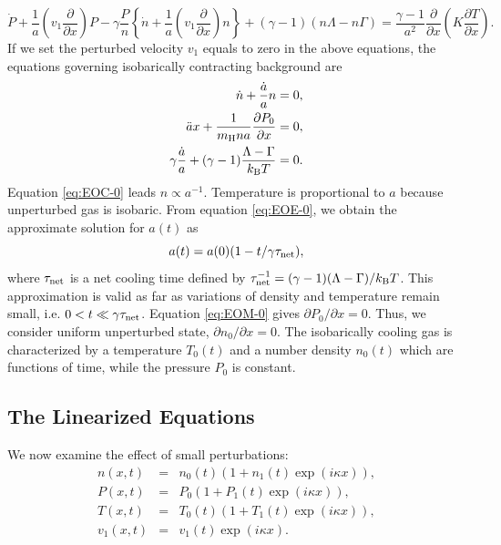 \begin{equation}
\dot{P}+\frac{1}{a}\left(v_1\frac{\partial}{\partial x}\right)P
-\gamma \frac{P}{n}
\left\{\dot{n}+\frac{1}{a}\left(v_1\frac{\partial}{\partial x}\right)n \right\}
+(\gamma-1)(n\Lambda-n\Gamma)
=\frac{\gamma-1}{a^2}\frac{\partial}{\partial x}
\left(K\frac{\partial T}{\partial x}\right).
\end{equation}
If we set the perturbed velocity $v_1$ equals to zero in the above equations,
the equations governing isobarically contracting background are
\begin{eqnarray}
\dot{n}+\frac{\dot{a}}{a}n=0, \label{eq:EOC-0} \\
\ddot{a}x+\frac{1}{m_{\rm H}na}\frac{\partial P_0}{\partial x}=0, \label{eq:EOM-0}\\
\gamma \frac{\dot{a}}{a}+(\gamma-1)\frac{\Lambda-\Gamma}{k_{\rm B}T}=0.
\label{eq:EOE-0}
\end{eqnarray}
Equation \ref{eq:EOC-0} leads $n\propto a^{-1}$.
Temperature is proportional to $a$
because unperturbed gas is isobaric. 
From equation \ref{eq:EOE-0}, we obtain the approximate solution for
$a(t)$ as
\begin{equation}
a(t)=a(0)(1-t/\gamma\tau_{\rm net}),
\end{equation}
where $\tau_{\rm net}$ is a net cooling time defined by 
$\tau_{\rm net}^{-1}=(\gamma-1)(\Lambda-\Gamma)/k_{\rm B}T$.
This approximation is valid as far as variations of density and
temperature remain small, i.e. $0<t\ll \gamma\tau_{\rm net}$.
Equation \ref{eq:EOM-0} gives $\partial P_0/\partial x=0$.
Thus, we consider uniform unperturbed state, $\partial n_0/\partial x=0$.
The isobarically cooling gas is characterized by a temperature
$T_0(t)$ and a number density $n_0(t)$ which are functions
of time, while the pressure $P_0$ is constant.

\subsection{The Linearized Equations}

We now examine the effect of small perturbations:
\begin{eqnarray}
n(x,t)&=&n_0(t)(1+n_1(t)\exp(i\kappa x)), \\
P(x,t)&=&P_0(1+P_1(t)\exp(i\kappa x)), \\
T(x,t)&=&T_0(t)(1+T_1(t)\exp(i\kappa x)),  \\
v_1(x,t)&=&v_1(t)\exp(i\kappa x).
\end{eqnarray}

